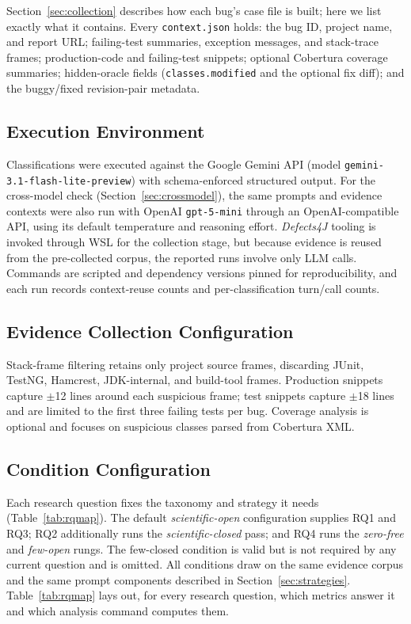 Section~\ref{sec:collection} describes how each bug's case file is built; here
we list exactly what it contains. Every \texttt{context.json} holds: the bug ID,
project name, and report URL; failing-test summaries, exception messages, and
stack-trace frames; production-code and failing-test snippets; optional
Cobertura coverage summaries; hidden-oracle fields (\texttt{classes.modified} and
the optional fix diff); and the buggy/fixed revision-pair metadata.

\subsection{Execution Environment}

Classifications were executed against the Google Gemini API (model
\texttt{gemini-3.1-flash-lite-preview}) with schema-enforced structured output.
For the cross-model check (Section~\ref{sec:crossmodel}), the same prompts and
evidence contexts were also run with OpenAI \texttt{gpt-5-mini} through an
OpenAI-compatible API, using its default temperature and reasoning effort.
\textit{Defects4J} tooling is invoked through WSL for the collection stage, but
because evidence is reused from the pre-collected corpus, the reported runs
involve only LLM calls. Commands are scripted and dependency versions pinned for
reproducibility, and each run records context-reuse counts and per-classification
turn/call counts.

\subsection{Evidence Collection Configuration}

Stack-frame filtering retains only project source frames, discarding JUnit,
TestNG, Hamcrest, JDK-internal, and build-tool frames. Production snippets capture
$\pm$12 lines around each suspicious frame; test snippets capture $\pm$18 lines
and are limited to the first three failing tests per bug. Coverage analysis is
optional and focuses on suspicious classes parsed from Cobertura XML.

\subsection{Condition Configuration}

Each research question fixes the taxonomy and strategy it needs
(Table~\ref{tab:rqmap}). The default \textit{scientific-open} configuration
supplies RQ1 and RQ3; RQ2 additionally runs the \textit{scientific-closed}
pass; and RQ4 runs the \textit{zero-free} and \textit{few-open} rungs. The
few-closed condition is valid but is not required by any current question and is
omitted. All conditions draw on the same evidence corpus and the same prompt
components described in Section~\ref{sec:strategies}. Table~\ref{tab:rqmap}
lays out, for every research question, which metrics answer it and which
analysis command computes them. 


